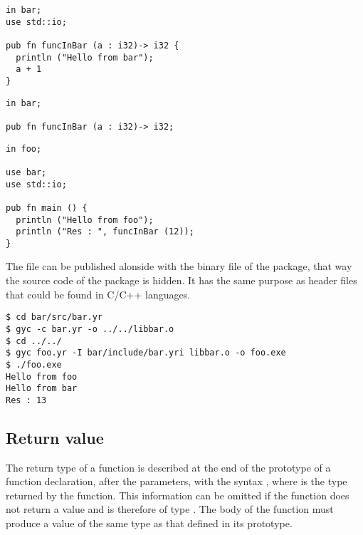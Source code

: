 \begin{lstlisting}[caption=\textit{./bar/src/bar.yr}, style=coloredverbatim]
in bar;
use std::io;

pub fn funcInBar (a : i32)-> i32 {
  println ("Hello from bar");
  a + 1
}
\end{lstlisting}

\begin{lstlisting}[caption=\textit{./bar/include/bar.yri}, style=coloredverbatim]
in bar;

pub fn funcInBar (a : i32)-> i32;
\end{lstlisting}
\begin{lstlisting}[caption=\textit{foo.yr}, style=coloredverbatim]
in foo;

use bar;
use std::io;

pub fn main () {
  println ("Hello from foo");
  println ("Res : ", funcInBar (12));
}
\end{lstlisting}


The file  can be published alonside with the
binary file of the  package, that way the source code of the package
 is hidden. It has the same purpose as header files that could be
found in C/C++ languages.

\begin{lstlisting}[style=intermediateVerb]
$ cd bar/src/bar.yr
$ gyc -c bar.yr -o ../../libbar.o
$ cd ../../
$ gyc foo.yr -I bar/include/bar.yri libbar.o -o foo.exe
$ ./foo.exe
Hello from foo
Hello from bar
Res : 13
\end{lstlisting}

\subsection {Return value}

The return type of a function is described at the end of the prototype of a
function declaration, after the parameters, with the syntax , where
 is the type returned by the function. This information can be omitted
if the function does not return a value and is therefore of type .
The body of the function must produce a value of the same type as that defined
in its prototype.

